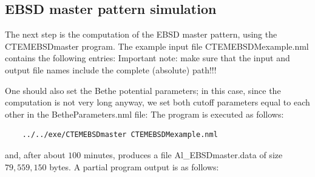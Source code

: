 \documentclass[DIV=calc, paper=letter, fontsize=11pt]{scrartcl}	 %
\begin{document}
\subsection{EBSD master pattern simulation}
The next step is the computation of the EBSD master pattern, using the \textsf{CTEMEBSDmaster} program. 
The example input file \textsf{CTEMEBSDMexample.nml} contains the following entries:
Important note: make sure that the input and output file names include the complete (absolute) path!!!

One should also set the Bethe potential parameters; in this case, since the computation is not very long anyway, 
we set both cutoff parameters equal to each other in the \textsf{BetheParameters.nml} file:
The program is executed as follows:
\begin{verbatim}
	../../exe/CTEMEBSDmaster CTEMEBSDMexample.nml
\end{verbatim}
and, after about $100$ minutes, produces a file \textsf{Al\_EBSDmaster.data} of size $79,559,150$ bytes.  A partial program output
is as follows:
\end{document}
